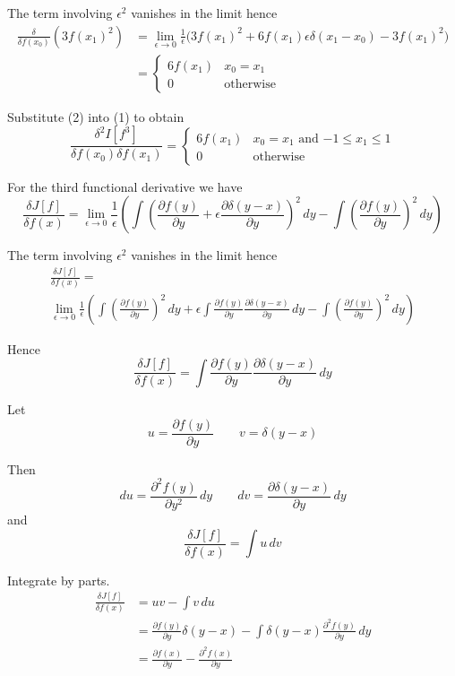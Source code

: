 \documentclass[12pt]{article}
\begin{document}
The term involving $\epsilon^2$ vanishes in the limit hence
\begin{align*}
\frac{\delta}{\delta f(x_0)}\left(3f(x_1)^2\right)
&=\lim_{\epsilon\rightarrow0}\frac{1}{\epsilon}
\big(
3f(x_1)^2+6f(x_1)\epsilon\delta(x_1-x_0)-3f(x_1)^2
\big)
\\
&=\begin{cases}
6f(x_1) & x_0=x_1
\\
0 & \text{otherwise}
\end{cases}
\tag{2}
\end{align*}

Substitute (2) into (1) to obtain
\begin{equation*}
\frac{\delta^2 I[f^3]}{\delta f(x_0)\delta f(x_1)}
=\begin{cases}
6f(x_1) & \text{$x_0=x_1$ and $-1\le x_1\le1$}
\\
0 & \text{otherwise}
\end{cases}
\end{equation*}

For the third functional derivative we have
\begin{equation*}
\frac{\delta J[f]}{\delta f(x)}
=\lim_{\epsilon\rightarrow0}\frac{1}{\epsilon}
\left(\int\left(
\frac{\partial f(y)}{\partial y}+\epsilon\frac{\partial\delta(y-x)}{\partial y}
\right)^2\,dy
-\int\left(\frac{\partial f(y)}{\partial y}\right)^2\,dy
\right)
\end{equation*}

The term involving $\epsilon^2$ vanishes in the limit hence
\begin{multline*}
\frac{\delta J[f]}{\delta f(x)}={}
\\
\lim_{\epsilon\rightarrow0}\frac{1}{\epsilon}
\left(
\int\left(\frac{\partial f(y)}{\partial y}\right)^2\,dy
+\epsilon\int\frac{\partial f(y)}{\partial y}\frac{\partial\delta(y-x)}{\partial y}\,dy
-\int\left(\frac{\partial f(y)}{\partial y}\right)^2\,dy
\right)
\end{multline*}

Hence
\begin{equation*}
\frac{\delta J[f]}{\delta f(x)}=\int\frac{\partial f(y)}{\partial y}\frac{\partial\delta(y-x)}{\partial y}\,dy
\end{equation*}

Let
\begin{equation*}
u=\frac{\partial f(y)}{\partial y}\qquad v=\delta(y-x)
\end{equation*}

Then
\begin{equation*}
du=\frac{\partial^2 f(y)}{\partial y^2}\,dy
\qquad
dv=\frac{\partial\delta(y-x)}{\partial y}\,dy
\end{equation*}
and
\begin{equation*}
\frac{\delta J[f]}{\delta f(x)}=\int u\,dv
\end{equation*}

Integrate by parts.
\begin{align*}
\frac{\delta J[f]}{\delta f(x)}
&=uv-\int v\,du
\\
&=\frac{\partial f(y)}{\partial y}\delta(y-x)
-\int\delta(y-x)\frac{\partial^2f(y)}{\partial y}\,dy
\\
&=\frac{\partial f(x)}{\partial y}-\frac{\partial^2f(x)}{\partial y}
\end{align*}
\end{document}
